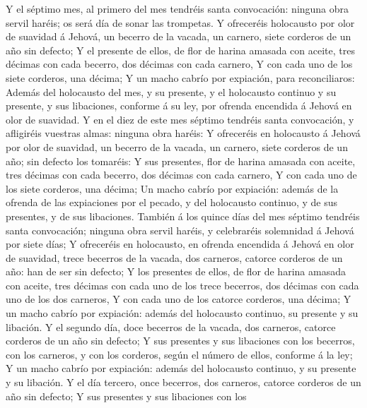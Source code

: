 Y el séptimo mes, al primero del mes tendréis santa
convocación: ninguna obra servil haréis; os será día de sonar las
trompetas.  Y ofreceréis holocausto por olor de suavidad á
Jehová, un becerro de la vacada, un carnero, siete corderos de un año
sin defecto;  Y el presente de ellos, de flor de harina
amasada con aceite, tres décimas con cada becerro, dos décimas con cada
carnero,  Y con cada uno de los siete corderos, una décima;
 Y un macho cabrío por expiación, para reconciliaros:
 Además del holocausto del mes, y su presente, y el
holocausto continuo y su presente, y sus libaciones, conforme á su ley,
por ofrenda encendida á Jehová en olor de suavidad.  Y en el
diez de este mes séptimo tendréis santa convocación, y afligiréis
vuestras almas: ninguna obra haréis:  Y ofreceréis en
holocausto á Jehová por olor de suavidad, un becerro de la vacada, un
carnero, siete corderos de un año; sin defecto los tomaréis:
 Y sus presentes, flor de harina amasada con aceite, tres
décimas con cada becerro, dos décimas con cada carnero,  Y
con cada uno de los siete corderos, una décima;  Un macho
cabrío por expiación: además de la ofrenda de las expiaciones por el
pecado, y del holocausto continuo, y de sus presentes, y de sus
libaciones.  También á los quince días del mes séptimo
tendréis santa convocación; ninguna obra servil haréis, y celebraréis
solemnidad á Jehová por siete días;  Y ofreceréis en
holocausto, en ofrenda encendida á Jehová en olor de suavidad, trece
becerros de la vacada, dos carneros, catorce corderos de un año: han de
ser sin defecto;  Y los presentes de ellos, de flor de
harina amasada con aceite, tres décimas con cada uno de los trece
becerros, dos décimas con cada uno de los dos carneros,  Y
con cada uno de los catorce corderos, una décima;  Y un
macho cabrío por expiación: además del holocausto continuo, su presente
y su libación.  Y el segundo día, doce becerros de la
vacada, dos carneros, catorce corderos de un año sin defecto;
 Y sus presentes y sus libaciones con los becerros, con los
carneros, y con los corderos, según el número de ellos, conforme á la
ley;  Y un macho cabrío por expiación: además del
holocausto continuo, y su presente y su libación.  Y el día
tercero, once becerros, dos carneros, catorce corderos de un año sin
defecto;  Y sus presentes y sus libaciones con los
